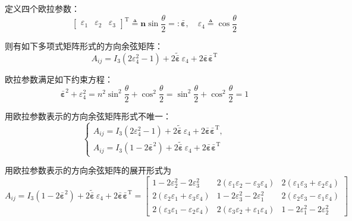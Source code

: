定义四个欧拉参数：
\begin{equation}
\begin{bmatrix}
\varepsilon_1 & \varepsilon_2 & \varepsilon_3
\end{bmatrix}^{\mathrm{T}}
\triangleq \boldsymbol{n}\sin\frac{\theta}{2} =: \bar{\boldsymbol{\varepsilon}}, \quad
\varepsilon_4 \triangleq \cos\frac{\theta}{2}
\label{eq:7.4}
\end{equation}

则有如下多项式矩阵形式的方向余弦矩阵：
\begin{equation}
A_{ij} = I_3(2\varepsilon_4^2 - 1) + 2\tilde{\bar{\boldsymbol{\varepsilon}}}\,\varepsilon_4 + 2\bar{\boldsymbol{\varepsilon}}\bar{\boldsymbol{\varepsilon}}^{\mathrm{T}}
\end{equation}

欧拉参数满足如下约束方程：
\begin{equation}
\bar{\boldsymbol{\varepsilon}}^2 + \varepsilon_4^2
= n^2\sin^2\frac{\theta}{2} + \cos^2\frac{\theta}{2}
= \sin^2\frac{\theta}{2} + \cos^2\frac{\theta}{2} = 1
\end{equation}

用欧拉参数表示的方向余弦矩阵形式不唯一：
\begin{equation}
\begin{cases}
A_{ij} = I_3(2\varepsilon_4^2 - 1) + 2\tilde{\bar{\boldsymbol{\varepsilon}}}\,\varepsilon_4 + 2\bar{\boldsymbol{\varepsilon}}\bar{\boldsymbol{\varepsilon}}^{\mathrm{T}}, \\[4pt]
A_{ij} = I_3(1 - 2\bar{\boldsymbol{\varepsilon}}^2) + 2\tilde{\bar{\boldsymbol{\varepsilon}}}\,\varepsilon_4 + 2\bar{\boldsymbol{\varepsilon}}\bar{\boldsymbol{\varepsilon}}^{\mathrm{T}}
\end{cases}
\label{eq:7.5}
\end{equation}

用欧拉参数表示的方向余弦矩阵的展开形式为
\begin{equation}
A_{ij} = I_3(1 - 2\bar{\boldsymbol{\varepsilon}}^2) + 2\tilde{\bar{\boldsymbol{\varepsilon}}}\,\varepsilon_4 + 2\bar{\boldsymbol{\varepsilon}}\bar{\boldsymbol{\varepsilon}}^{\mathrm{T}}
=
\begin{bmatrix}
1 - 2\varepsilon_2^2 - 2\varepsilon_3^2 & 2(\varepsilon_1\varepsilon_2 - \varepsilon_3\varepsilon_4) & 2(\varepsilon_1\varepsilon_3 + \varepsilon_2\varepsilon_4) \\[4pt]
2(\varepsilon_2\varepsilon_1 + \varepsilon_3\varepsilon_4) & 1 - 2\varepsilon_3^2 - 2\varepsilon_1^2 & 2(\varepsilon_2\varepsilon_3 - \varepsilon_1\varepsilon_4) \\[4pt]
2(\varepsilon_3\varepsilon_1 - \varepsilon_2\varepsilon_4) & 2(\varepsilon_3\varepsilon_2 + \varepsilon_1\varepsilon_4) & 1 - 2\varepsilon_1^2 - 2\varepsilon_2^2
\end{bmatrix}
\label{eq:7.6}
\end{equation}

